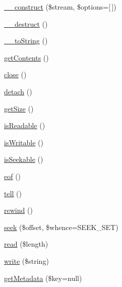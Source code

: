 \begin{DoxyCompactItemize}
\item 
\hyperlink{classGuzzleHttp_1_1Psr7_1_1Stream_ae3f42d9d8ff3d4debb51e33312bc6706}{\+\_\+\+\_\+construct} (\$stream, \$options=\mbox{[}$\,$\mbox{]})
\item 
\hyperlink{classGuzzleHttp_1_1Psr7_1_1Stream_a119e5b9c5a9407ed08b9093b85cfe317}{\+\_\+\+\_\+destruct} ()
\item 
\hyperlink{classGuzzleHttp_1_1Psr7_1_1Stream_a8decf1a3294743f9bea9c47e16b25375}{\+\_\+\+\_\+to\+String} ()
\item 
\hyperlink{classGuzzleHttp_1_1Psr7_1_1Stream_a60de62d579dc9e4677452a91b7c4a336}{get\+Contents} ()
\item 
\hyperlink{classGuzzleHttp_1_1Psr7_1_1Stream_a68ef1ae70e99df7f8553083e66e900d9}{close} ()
\item 
\hyperlink{classGuzzleHttp_1_1Psr7_1_1Stream_a4b82bb1cfca1d5e8939d9717779b870f}{detach} ()
\item 
\hyperlink{classGuzzleHttp_1_1Psr7_1_1Stream_ac6f693e5cb59c136d0808117aab61396}{get\+Size} ()
\item 
\hyperlink{classGuzzleHttp_1_1Psr7_1_1Stream_aab579a16dc9a78166538a6d2d6c00e1b}{is\+Readable} ()
\item 
\hyperlink{classGuzzleHttp_1_1Psr7_1_1Stream_a12a133d09c80a10b63d5194dcbb6be95}{is\+Writable} ()
\item 
\hyperlink{classGuzzleHttp_1_1Psr7_1_1Stream_a9c550016f44e763b6acc5b6be865b3f6}{is\+Seekable} ()
\item 
\hyperlink{classGuzzleHttp_1_1Psr7_1_1Stream_a3f44f4ac800bd92b0adc5539ac6ad64f}{eof} ()
\item 
\hyperlink{classGuzzleHttp_1_1Psr7_1_1Stream_a8340644980841db5830ef26a661dcc6d}{tell} ()
\item 
\hyperlink{classGuzzleHttp_1_1Psr7_1_1Stream_abe54d2885cbc219347016c3ccfed1055}{rewind} ()
\item 
\hyperlink{classGuzzleHttp_1_1Psr7_1_1Stream_abf9d99bb0f70f34723dbfeb80678ad79}{seek} (\$offset, \$whence=S\+E\+E\+K\+\_\+\+S\+ET)
\item 
\hyperlink{classGuzzleHttp_1_1Psr7_1_1Stream_a4f9990fde8a72f6555cc3a55ee6c9a98}{read} (\$length)
\item 
\hyperlink{classGuzzleHttp_1_1Psr7_1_1Stream_a53602289e59e6b492463c0295211f698}{write} (\$string)
\item 
\hyperlink{classGuzzleHttp_1_1Psr7_1_1Stream_a35f44d3d2b973f128c493f7359c42dbb}{get\+Metadata} (\$key=null)
\end{DoxyCompactItemize}

